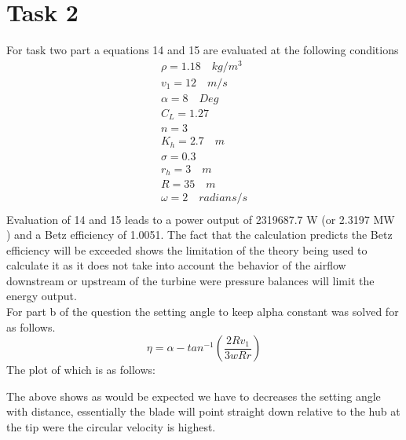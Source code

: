 \documentclass[11pt,a4paper]{article}
\begin{document}
\section{Task 2}
For task two  part a equations 14 and 15 are evaluated at the following conditions
\begin{align*}
\rho = 1.18 \quad kg/m^3 \\
v_1 = 12 \quad m/s \\
\alpha = 8 \quad Deg \\
C_L = 1.27 \\
n = 3 \\
K_h = 2.7 \quad m \\
\sigma = 0.3 \\
r_h = 3 \quad m \\
R = 35 \quad m \\
\omega = 2 \quad radians/s \\
\end{align*}
Evaluation of 14 and 15 leads to a power output of 2319687.7 W (or 2.3197 MW ) and a Betz efficiency of 1.0051. The fact that the calculation predicts the Betz efficiency will be exceeded shows the limitation of the theory being used to calculate it as it does not take into account the behavior of the airflow downstream or upstream of the turbine were pressure balances will limit the energy output.\\
For part b of the question the setting angle to keep alpha constant was solved for as follows.
\begin{equation}
\eta = \alpha - tan^{-1}(\frac{2Rv_1}{3wRr})
\end{equation}
The plot of which is as follows:

The above shows as would be expected we have to decreases the setting angle with distance, essentially the blade will point straight down relative to the hub at the tip were the circular velocity is highest.
\end{document}
